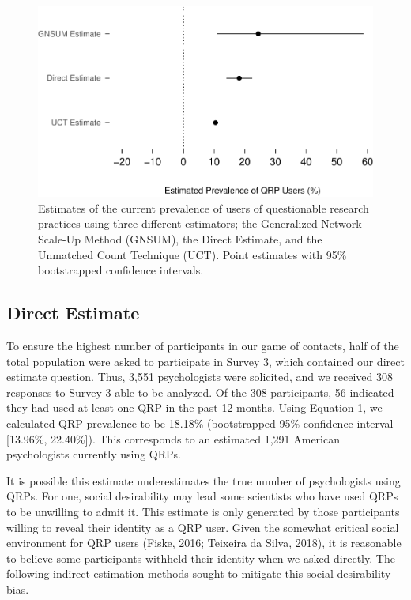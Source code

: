 \documentclass[jou]{apa6}
\theoremstyle{definition}
\theoremstyle{definition}
\theoremstyle{definition}
\theoremstyle{remark}
\begin{document}
\begin{figure}
\centering
\includegraphics{papaja_paper_20180810_files/figure-latex/unnamed-chunk-13-1.pdf}
\caption{\label{fig:unnamed-chunk-13}\label{fig:estimate}Estimates of the
current prevalence of users of questionable research practices using
three different estimators; the Generalized Network Scale-Up Method
(GNSUM), the Direct Estimate, and the Unmatched Count Technique (UCT).
Point estimates with 95\% bootstrapped confidence intervals.}
\end{figure}

\subsection{Direct Estimate}\label{direct-estimate-1}

To ensure the highest number of participants in our game of contacts,
half of the total population were asked to participate in Survey 3,
which contained our direct estimate question. Thus, 3,551 psychologists
were solicited, and we received 308 responses to Survey 3 able to be
analyzed. Of the 308 participants, 56 indicated they had used at least
one QRP in the past 12 months. Using Equation 1, we calculated QRP
prevalence to be 18.18\% (bootstrapped 95\% confidence interval
{[}13.96\%, 22.40\%{]}). This corresponds to an estimated 1,291 American
psychologists currently using QRPs.

It is possible this estimate underestimates the true number of
psychologists using QRPs. For one, social desirability may lead some
scientists who have used QRPs to be unwilling to admit it. This estimate
is only generated by those participants willing to reveal their identity
as a QRP user. Given the somewhat critical social environment for QRP
users (Fiske, 2016; Teixeira da Silva, 2018), it is reasonable to
believe some participants withheld their identity when we asked
directly. The following indirect estimation methods sought to mitigate
this social desirability bias.
\end{document}
